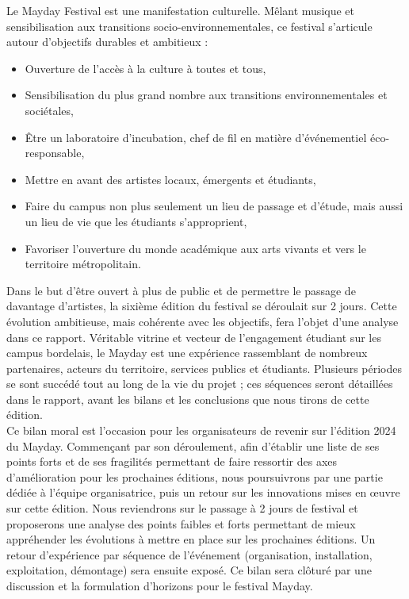 \documentclass[12pt,a4paper]{report}
\begin{document}
Le Mayday Festival est une manifestation culturelle. Mêlant musique et sensibilisation aux transitions socio-environnementales, ce festival s'articule autour d'objectifs durables et ambitieux :
\begin{itemize}
\item Ouverture de l’accès à la culture à toutes et tous,
\item Sensibilisation du plus grand nombre aux transitions environnementales et sociétales,
\item Être un laboratoire d’incubation, chef de fil en matière d’événementiel éco-responsable,
\item Mettre en avant des artistes locaux, émergents et étudiants,
\item Faire du campus non plus seulement un lieu de passage et d'étude, mais aussi un lieu de vie que les étudiants s'approprient,
\item Favoriser l’ouverture du monde académique aux arts vivants et vers le territoire métropolitain.\\
\end{itemize}

Dans le but d’être ouvert à plus de public et de permettre le passage de davantage d’artistes, la sixième édition du festival se déroulait sur 2 jours. Cette évolution ambitieuse, mais cohérente avec les objectifs, fera l’objet d’une analyse dans ce rapport. Véritable vitrine et vecteur de l'engagement étudiant sur les campus bordelais, le Mayday est une expérience rassemblant de nombreux partenaires, acteurs du territoire, services publics et étudiants. Plusieurs périodes se sont succédé tout au long de la vie du projet ; ces séquences seront détaillées dans le rapport, avant les bilans et les conclusions que nous tirons de cette édition.\\

Ce bilan moral est l’occasion pour les organisateurs de revenir sur l’édition 2024 du Mayday. Commençant par son déroulement, afin d’établir une liste de ses points forts et de ses fragilités permettant de faire ressortir des axes d’amélioration pour les prochaines éditions, nous poursuivrons par une partie dédiée à l'équipe organisatrice, puis un retour sur les innovations mises en œuvre sur cette édition. Nous reviendrons sur le passage à 2 jours de festival et proposerons une analyse des points faibles et forts permettant de mieux appréhender les évolutions à mettre en place sur les prochaines éditions. Un retour d'expérience par séquence de l'événement (organisation, installation, exploitation, démontage) sera ensuite exposé. Ce bilan sera clôturé par une discussion et la formulation d'horizons pour le festival Mayday.
\end{document}
